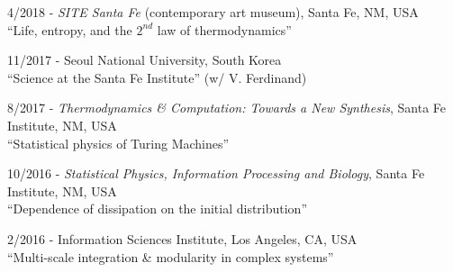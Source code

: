 \documentclass[margin,line,centered]{res}
\begin{document}
\begin{resume}
4/2018 - \emph{SITE Santa Fe} (contemporary art museum), Santa Fe, NM, USA\\
``Life, entropy, and the $2^{{nd}}$ law of thermodynamics''

11/2017 - Seoul National University, South Korea\\
``Science at the Santa Fe Institute'' (w/ V. Ferdinand) %

8/2017 - \emph{Thermodynamics \& Computation: Towards a New Synthesis}, Santa Fe Institute, NM, USA\\
``Statistical physics of Turing Machines'' %

10/2016 - \emph{Statistical Physics, Information Processing and Biology}, Santa Fe Institute, NM, USA \\
``Dependence of dissipation on the initial distribution'' %

2/2016 - Information Sciences Institute, Los Angeles, CA, USA\\
``Multi-scale integration \& modularity in complex systems'' %











\end{resume}
\end{document}
